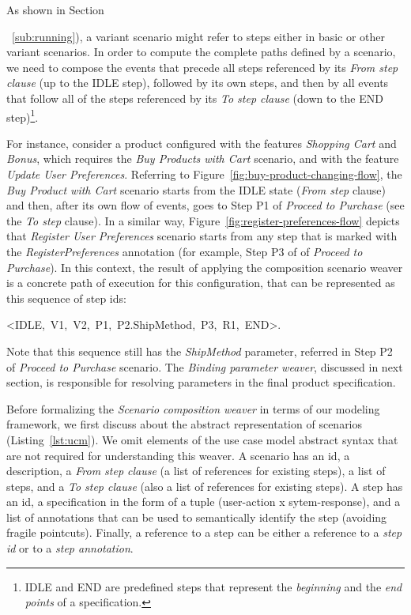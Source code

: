 \documentclass{acm_proc_article-sp}
\begin{document}
As shown in Section{~\ref{sub:running}), a variant scenario 
might refer to steps either in basic or other variant scenarios. In order
to compute the complete paths defined by a scenario, we need to compose the events that precede all steps referenced by its \emph{From step
clause} (up to the IDLE step), followed by its own steps, and then by all
events that follow all of the steps referenced by its \emph{To step clause} (down to the END step)\footnote{IDLE and END are predefined steps that
represent the \emph{beginning} and the \emph{end points} of a
specification.}. 

For instance, consider a product configured with the features \emph{Shopping Cart} and \emph{Bonus}, which requires the \emph{Buy Products with Cart} scenario, and with the feature \emph{Update User Preferences}. Referring to Figure~\ref{fig:buy-product-changing-flow}, the  \emph{Buy Product with Cart} scenario starts from the IDLE state (\emph{From step} clause) and then, after its own flow of events, goes to Step P1 of \emph{Proceed to Purchase} (see the \emph{To step} clause). In a similar way, Figure~\ref{fig:register-preferences-flow} depicts that \emph{Register User Preferences} scenario starts from any step that is marked with the \emph{RegisterPreferences} annotation (for example, Step P3 of of \emph{Proceed to Purchase}). In this context, the result of applying the composition scenario weaver is a concrete path of execution for this configuration, that can be represented as this sequence of step ids: 

\begin{center}
\mbox{<IDLE, V1, V2, P1, P2.ShipMethod, P3, R1, END>}.
\end{center}

Note that this sequence still has  the \emph{ShipMethod} parameter, 
referred in Step P2 of \emph{Proceed to Purchase} scenario. The \emph{Binding parameter weaver}, discussed in next section, is responsible for resolving parameters in the final 
product specification.  

Before formalizing the \emph{Scenario composition weaver}  in terms of our modeling framework, we 
first discuss about the abstract representation of scenarios (Listing~\ref{lst:ucm}). We omit elements of the use case model abstract syntax that are not required for understanding this weaver. A scenario has an id, a
description, a \emph{From step clause} (a list of references for
existing steps), a list of steps, and a \emph{To step clause} (also
a list of references for existing steps). A step has an id, a
specification in the form of a tuple
(user-action x sytem-response), and a list of annotations
that can be used to semantically identify the step (avoiding
fragile pointcuts). Finally, a reference to a step can be either a reference to a \emph{step id} or to a \emph{step annotation}.

}
\end{document}
